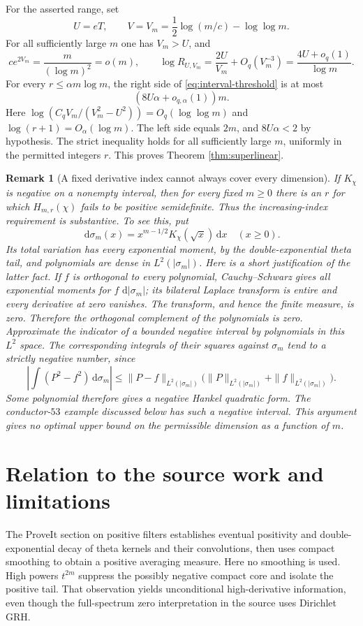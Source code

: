 \documentclass[11pt]{article}
\newtheorem{remark}[theorem]{Remark}
\newcommand{\dd}{\,\mathrm d}
\begin{document}
For the asserted range, set
\[
 U=eT,\qquad V=V_m=\frac12\log(m/c)-\log\log m.
\]
For all sufficiently large $m$ one has $V_m>U$, and
\[
 ce^{2V_m}=\frac{m}{(\log m)^2}=o(m),\qquad
 \log R_{U,V_m}=\frac{2U}{V_m}+O_q(V_m^{-3})
 =\frac{4U+o_q(1)}{\log m}.
\]
For every $r\le\alpha m\log m$, the right side of \eqref{eq:interval-threshold} is at most
\[
 (8U\alpha+o_{q,\alpha}(1))m.
\]
Here $\log(C_qV_m/(V_m^2-U^2))=O_q(\log\log m)$ and $\log(r+1)=O_\alpha(\log m)$. The left side equals $2m$, and $8U\alpha<2$ by hypothesis. The strict inequality holds for all sufficiently large $m$, uniformly in the permitted integers $r$. This proves Theorem \ref{thm:superlinear}.

\begin{remark}[A fixed derivative index cannot always cover every dimension]
If $K_\chi$ is negative on a nonempty interval, then for every fixed $m\ge0$ there is an $r$ for which $H_{m,r}(\chi)$ fails to be positive semidefinite. Thus the increasing-index requirement is substantive. To see this, put
\[
 \dd\sigma_m(x)=x^{m-1/2}K_\chi(\sqrt x)\dd x\quad(x\ge0).
\]
Its total variation has every exponential moment, by the double-exponential theta tail, and polynomials are dense in $L^2(|\sigma_m|)$. Here is a short justification of the latter fact. If $f$ is orthogonal to every polynomial, Cauchy--Schwarz gives all exponential moments for $f\,\dd|\sigma_m|$; its bilateral Laplace transform is entire and every derivative at zero vanishes. The transform, and hence the finite measure, is zero. Therefore the orthogonal complement of the polynomials is zero. Approximate the indicator of a bounded negative interval by polynomials in this $L^2$ space. The corresponding integrals of their squares against $\sigma_m$ tend to a strictly negative number, since
\[
 \left|\int(P^2-f^2)\dd\sigma_m\right|
 \le\|P-f\|_{L^2(|\sigma_m|)}
 \bigl(\|P\|_{L^2(|\sigma_m|)}+\|f\|_{L^2(|\sigma_m|)}\bigr).
\]
Some polynomial therefore gives a negative Hankel quadratic form. The conductor-$53$ example discussed below has such a negative interval. This argument gives no optimal upper bound on the permissible dimension as a function of $m$.
\end{remark}

\section{Relation to the source work and limitations}
The ProveIt section on positive filters establishes eventual positivity and double-exponential decay of theta kernels and their convolutions, then uses compact smoothing to obtain a positive averaging measure. Here no smoothing is used. High powers $t^{2m}$ suppress the possibly negative compact core and isolate the positive tail. That observation yields unconditional high-derivative information, even though the full-spectrum zero interpretation in the source uses Dirichlet GRH.
\end{document}
